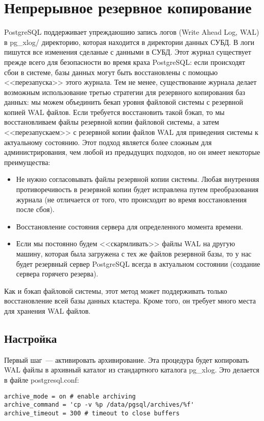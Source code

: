 \section{Непрерывное резервное копирование}
PostgreSQL поддерживает упреждаюшию запись логов (Write Ahead Log, WAL) в pg\_xlog/ директорию, которая находится в директории 
данных СУБД. 
В логи пишутся все изменения сделаные с данными в СУБД. Этот журнал существует прежде всего для безопасности во 
время краха PostgreSQL: если происходят сбои в системе, базы данных могут быть восстановлены с помощью <<перезапуска>> этого 
журнала. Тем не менее, существование журнала делает возможным использование третью стратегии для резервного копирования 
баз данных: мы можем объединить бекап уровня файловой системы с резервной копией WAL файлов. Если требуется восстановить такой бэкап, то 
мы восстановливаем файлы резервной копии файловой системы, а затем <<перезапускаем>> с резервной копии файлов WAL для приведения 
системы к актуальному состоянию. Этот подход является более сложным для администрирования, чем любой из предыдущих подходов, 
но он имеет некоторые преимущества:
\begin{itemize}
\item Не нужно согласовывать файлы резервной копии системы. Любая внутренняя противоречивость в резервной копии будет исправлена 
путем преобразования журнала (не отличается от того, что происходит во время восстановления после сбоя). 
\item Восстановление состояния сервера для определенного момента времени.
\item Если мы постоянно будем <<скармливать>> файлы WAL на другую машину, которая была загружена с тех же файлов резервной базы, 
то у нас будет резервный сервер PostgreSQL всегда в актуальном состоянии (создание сервера горячего резерва).
\end{itemize}

Как и бэкап файловой системы, этот метод может поддерживать только восстановление всей базы данных кластера. Кроме того, он требует 
много места для хранения WAL файлов.

\subsection{Настройка}
Первый шаг~--- активировать архивирование. Эта процедура будет копировать WAL файлы в архивный каталог из 
стандартного каталога pg\_xlog. Это делается в файле postgresql.conf:
\begin{lstlisting}[label=lst:backups15,caption=Настройка архивирования]
archive_mode = on # enable archiving
archive_command = 'cp -v %p /data/pgsql/archives/%f'
archive_timeout = 300 # timeout to close buffers
\end{lstlisting}

